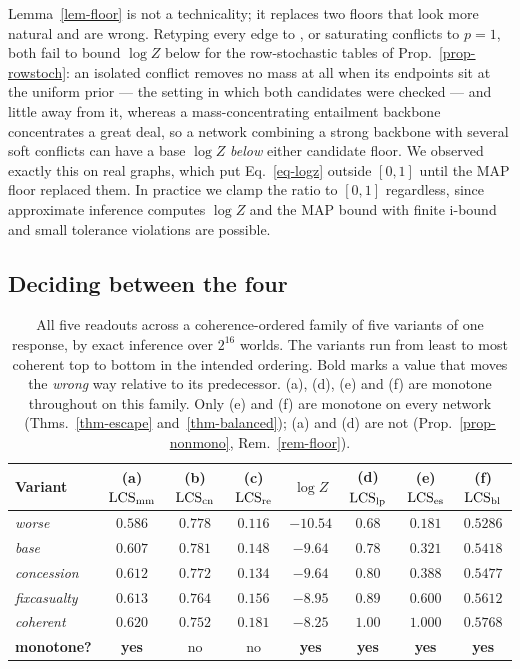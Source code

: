 Lemma~\ref{lem-floor} is not a technicality; it replaces two floors that look more natural and are
wrong. Retyping every edge to \con{}, or saturating conflicts to $p=1$, both fail to bound $\log Z$
below for the row-stochastic tables of Prop.~\ref{prop-rowstoch}: an isolated conflict removes no
mass at all when its endpoints sit at the uniform prior --- the setting in which both candidates were
checked --- and little away from it, whereas a mass-concentrating entailment backbone concentrates a
great deal, so a network combining a strong backbone with several soft conflicts can have a base
$\log Z$ \emph{below} either candidate floor. We observed exactly this on real graphs, which put
Eq.~\ref{eq-logz} outside $[0,1]$ until the MAP floor replaced them. In practice we clamp the ratio
to $[0,1]$ regardless, since approximate inference computes $\log Z$ and the MAP bound with finite
i-bound and small tolerance violations are possible.

\subsection{Deciding between the four}
\label{sec-selection}

\begin{table}[tbp]
\centering\small
\caption{All five readouts across a coherence-ordered family of five variants of one response, by
  exact inference over $2^{16}$ worlds. The variants run from least to most coherent top to bottom in
  the intended ordering. Bold marks a value that moves the \emph{wrong} way relative to its
  predecessor. (a), (d), (e) and (f) are monotone throughout on this family. Only (e) and (f) are
  monotone on every network (Thms.~\ref{thm-escape} and~\ref{thm-balanced}); (a) and (d) are not
  (Prop.~\ref{prop-nonmono}, Rem.~\ref{rem-floor}).}
\label{tab:allcands}
\setlength{\tabcolsep}{4pt}
\begin{tabular}{@{}lccccccc@{}}
\toprule
Variant & (a) $\mathrm{LCS}_{\mathrm{mm}}$ & (b) $\mathrm{LCS}_{\mathrm{cn}}$ & (c) $\mathrm{LCS}_{\mathrm{re}}$ & $\log Z$ & (d) $\mathrm{LCS}_{\mathrm{lp}}$
  & (e) $\mathrm{LCS}_{\mathrm{es}}$ & (f) $\mathrm{LCS}_{\mathrm{bl}}$ \\
\midrule
\emph{worse}       & $0.586$ & $\mathbf{0.778}$ & $0.116$ & $-10.54$ & $0.68$ & $0.181$ & $0.5286$ \\
\emph{base}        & $0.607$ & $0.781$          & $0.148$ & $-9.64$  & $0.78$ & $0.321$ & $0.5418$ \\
\emph{concession}  & $0.612$ & $\mathbf{0.772}$ & $\mathbf{0.134}$ & $-9.64$ & $0.80$ & $0.388$ & $0.5477$ \\
\emph{fixcasualty} & $0.613$ & $\mathbf{0.764}$ & $0.156$ & $-8.95$  & $0.89$ & $0.600$ & $0.5612$ \\
\emph{coherent}    & $0.620$ & $\mathbf{0.752}$ & $0.181$ & $-8.25$  & $1.00$ & $1.000$ & $0.5768$ \\
\midrule
\textbf{monotone?} & \textbf{yes} & no & no & \textbf{yes} & \textbf{yes} & \textbf{yes} & \textbf{yes} \\
\bottomrule
\end{tabular}
\end{table}


